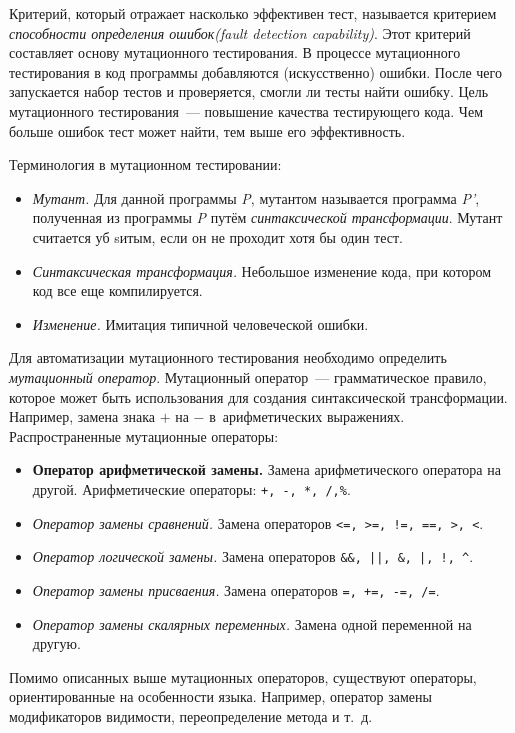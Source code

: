 Критерий, который отражает насколько эффективен тест, называется критерием \textit{способности определения ошибок(fault detection capability)}. Этот критерий составляет основу мутационного тестирования. В процессе мутационного тестирования в код программы добавляются (искусственно) ошибки. После чего запускается набор тестов и проверяется, смогли ли тесты найти ошибку. Цель мутационного тестирования~--- повышение качества тестирующего кода. Чем больше ошибок тест может найти, тем выше его эффективность.

Терминология в мутационном тестировании:

\begin{itemize}
	\item \textit{Мутант.} Для данной программы \textit{P}, мутантом называется программа \textit{P'}, полученная из программы \textit{P} путём \textit{синтаксической трансформации}. Мутант считается уб sитым, если он не проходит хотя бы один тест.
	\item \textit{Синтаксическая трансформация.} Небольшое изменение кода, при котором код все еще компилируется.
	\item \textit{Изменение.} Имитация типичной человеческой ошибки. 
\end{itemize}

Для автоматизации мутационного тестирования необходимо определить \textit{мутационный оператор}. Мутационный оператор~--- грамматическое правило, которое может быть использования для создания синтаксической трансформации. Например, замена знака \(+\) на 
\(-\) в~арифметических выражениях. Распространенные мутационные операторы:

\begin{itemize}
	\item \textbf{Оператор арифметической замены.} Замена арифметического оператора на другой. Арифметические операторы: \texttt{+, -, *, /,\%}.
	\item \textit{Оператор замены сравнений.} Замена операторов \texttt{<=, >=, !=, ==, >, <}.
	\item \textit{Оператор логической замены.} Замена операторов \texttt{\&\&, ||, \&, |, !, \^}.
	\item \textit{Оператор замены присваения.} Замена операторов \texttt{=, +=, -=, /=}.
	\item \textit{Оператор замены скалярных переменных.}  Замена одной переменной на другую.
\end{itemize}

Помимо описанных выше мутационных операторов, существуют операторы, ориентированные на особенности языка. Например, оператор замены модификаторов видимости, переопределение метода и т.~д.

